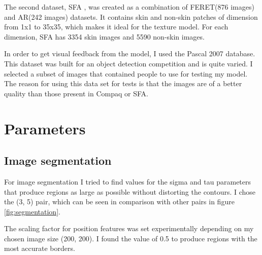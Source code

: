 \documentclass[12pt]{report}
\begin{document}
	The second dataset, SFA \cite{sfa}, was created as a combination of FERET(876 images) and AR(242 images)  datasets. It contains skin and non-skin patches of dimension from 1x1 to 35x35, which makes it ideal for the texture model. For each dimension, SFA has 3354 skin images and 5590 non-skin images.
	
	In order to get visual feedback from the model, I used the Pascal 2007 database\cite{pascal-voc-2007}. This dataset was built for an object detection competition and is quite varied. I selected a subset of images that contained people to use for testing my model. The reason for using this data set for tests is that the images are of a better quality than those present in Compaq or SFA.
	
	\section{Parameters}
	
	\subsection{Image segmentation}
	For image segmentation I tried to find values for the sigma and tau parameters that produce regions as large as possible without distorting the contours. I chose the (3, 5) pair, which can be seen in comparison with other pairs in figure \ref{fig:segmentation}.
	
	The scaling factor for position features was set experimentally depending on my chosen image size (200, 200). I found the value of 0.5 to produce regions with the most accurate borders.
	
\end{document}
